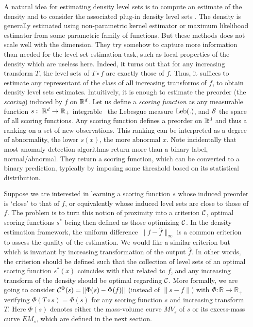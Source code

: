 
A natural idea for estimating density level sets is to compute an estimate of the density and to consider the associated plug-in density level sets \citep{Tsybakov1997, Cuevas1997, Baillo2001, Baillo2003, Cadre2006, Rigollet2009, Mason2009}.
The density is generally estimated using non-parametric kernel estimator or maximum likelihood estimator from some parametric family of functions. But these methods does not scale well with the dimension. They try somehow to capture more information than needed for the level set estimation task, such as local properties of the density which are useless here. Indeed, it turns out that for any increasing transform $T$, the level sets of $T\circ f$ are exactly those of $f$. Thus, it suffices to estimate any representant of the class of all increasing transforms of $f$, to obtain density level sets estimates. Intuitively, it is enough to estimate the preorder (the \emph{scoring}) induced by $f$ on $\rset^d$. Let us define a \emph{scoring function} as any measurable function $s:~\rset^d \to \rset_+$ integrable \wrt~the Lebesgue measure $\leb(.)$, and $\S$ the space of all scoring functions.
Any scoring function defines a preorder on $\rset^d$ and thus a ranking on a set of new observations. This ranking can be interpreted as a degree of abnormality, the lower $s(x)$, the more abnormal $x$. Note incidentally that most anomaly detection algorithms return more than a binary label, normal/abnormal. They return a scoring function, which can be converted to a binary prediction, typically by imposing some threshold based on its statistical distribution.

Suppose we are interested in learning a scoring function $s$ whose induced preorder is `close' to that of $f$, or equivalently whose induced level sets are close to those of $f$. The problem is to turn this notion of proximity into a criterion $\crit$, optimal scoring functions $s^*$ being then defined as those optimizing $\crit$. In the density estimation framework, the uniform difference $\|f - \hat f\|_\infty$ is a common criterion to assess the quality of the estimation. We would like a similar criterion but which is invariant by increasing transformation of the output $\hat f$. In other words, the criterion should be defined such that the collection of level sets of an optimal scoring function $s^*(x)$ coincides with that related to $f$, and any increasing transform of the density should be optimal regarding $\crit$.
More formally, we are going to consider $\crit^{\Phi}(s) = \| \Phi(s) - \Phi(f) \|$ (instead of $\|s - f\|$) %
with $\Phi: \mathbb{R} \to \mathbb{R}_+$ verifying $\Phi(T \circ s) = \Phi(s)$ 
for any scoring function $s$ and increasing transform $T$. Here $\Phi(s)$ denotes either the mass-volume curve $MV_s$ of $s$ or its excess-mass curve $EM_s$, which are defined in the next section.  



